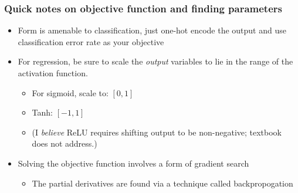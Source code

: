 \documentclass[mathserif, aspectratio=169]{beamer}
\begin{document}
\begin{frame}[t]\frametitle{Quick notes on objective function and finding parameters}
    
	\begin{itemize}
	 	\item Form is amenable to classification, just one-hot encode the output and use classification error rate as your objective
	 	\item For regression, be sure to scale the \textit{output} variables to lie in the range of the activation function. 
	 	\begin{itemize}
	 		\item For sigmoid, scale to: \pause $[0,1]$
	 		\item Tanh: \pause $[-1,1]$
	 		\pause
	 		\item (I \textit{believe} ReLU requires shifting output to be non-negative; textbook does not address.)
	 	\end{itemize}
	 	\item Solving the objective function involves a form of gradient search
	 	\begin{itemize}
	 	 	\item The partial derivatives are found via a technique called backpropogation
	 	 \end{itemize} 
	\end{itemize} 

\end{frame}
\end{document}
